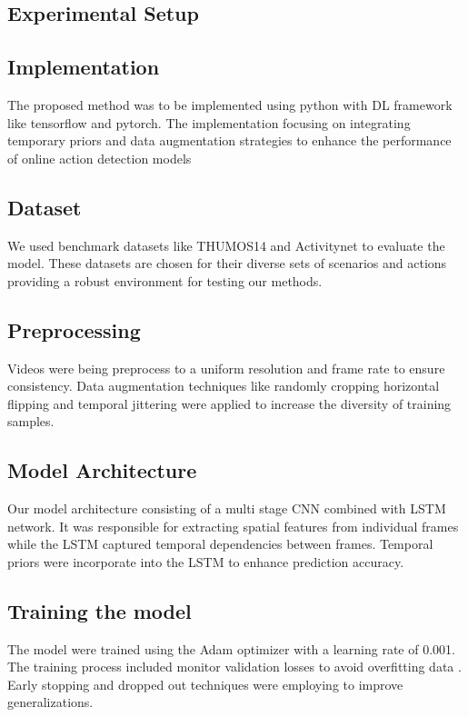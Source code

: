 \subsection{Experimental Setup}{
\subsection{Implementation}

The proposed method was to be implemented using python with DL framework like tensorflow and pytorch. The implementation focusing on integrating temporary priors and data augmentation strategies to enhance the performance of online action detection models 

\subsection{Dataset}

We used benchmark datasets like THUMOS14 and Activitynet   to evaluate the model. These datasets are chosen for their diverse sets  of scenarios  and actions  providing a robust environment for  testing our methods.


\subsection{Preprocessing
}

Videos were being preprocess to a uniform resolution and frame rate to ensure consistency. Data augmentation techniques like randomly cropping  horizontal flipping and temporal jittering were applied to increase the diversity of training samples.

\subsection{Model Architecture
}

Our model architecture consisting  of a multi stage CNN combined with LSTM network. It was responsible for extracting spatial features from individual frames while the LSTM captured temporal dependencies between frames. Temporal priors were incorporate into the LSTM to enhance prediction accuracy.

\subsection{Training the model
}

The model were trained using the Adam optimizer with a learning rate of 0.001. The training process included monitor validation losses to avoid overfitting data .  Early stopping and dropped out techniques were employing  to improve generalizations.

}
